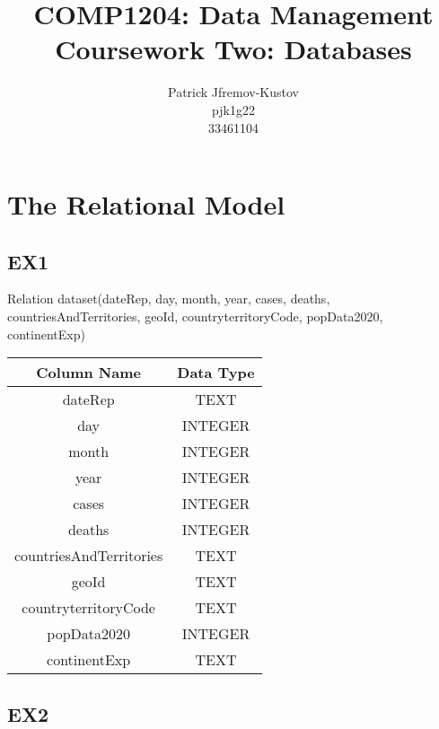 \documentclass{article}
\title{COMP1204: Data Management \\ Coursework Two: Databases}
\author{Patrick Jfremov-Kustov \\ pjk1g22 \\ 33461104}
\date{}
\begin{document}
\maketitle

\section{The Relational Model}

\subsection{EX1}

Relation dataset(dateRep, day, month, year, cases, deaths, countriesAndTerritories, geoId, countryterritoryCode, popData2020, continentExp)

\begin{center}
\begin{tabular}{ |c|c| } 
 \hline
 \textbf{Column Name} & \textbf{Data Type} \\ 
 \hline
 dateRep & TEXT \\ 
 \hline
 day & INTEGER \\ 
 \hline
 month & INTEGER \\ 
 \hline
 year & INTEGER \\ 
 \hline
 cases & INTEGER \\ 
 \hline
 deaths & INTEGER \\ 
 \hline
 countriesAndTerritories & TEXT \\ 
 \hline
 geoId & TEXT \\ 
 \hline
 countryterritoryCode & TEXT \\ 
 \hline
 popData2020 & INTEGER \\ 
 \hline
 continentExp & TEXT \\ 
 \hline
\end{tabular}
\end{center}

\subsection{EX2}
\end{document}

